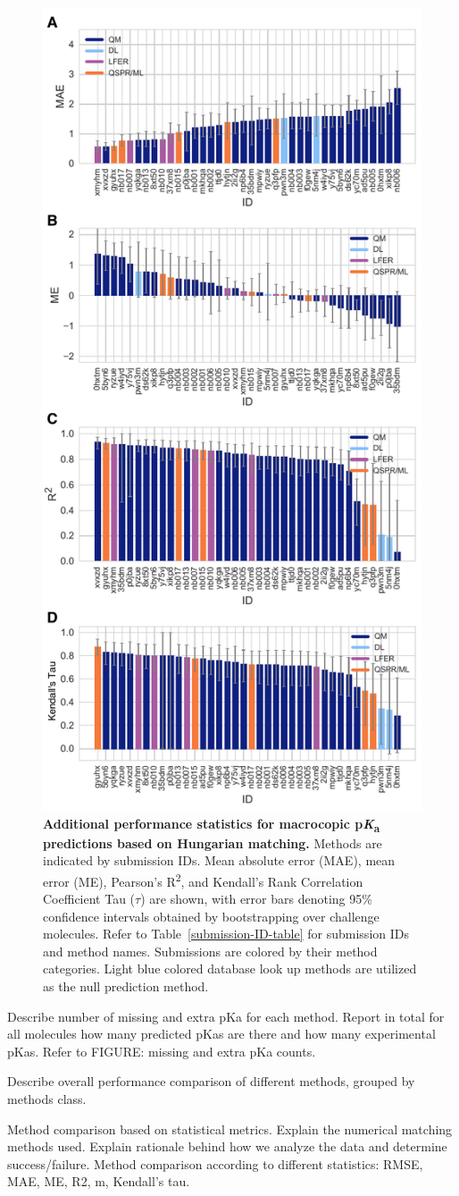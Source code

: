 \documentclass[9pt,lineno,final]{elife}
\newcommand{\pKa}{p\textit{K}\textsubscript{a}}
\begin{document}
\begin{figure}
\centering
\includegraphics[width=0.5\linewidth]{figures/typeIII_statistics.pdf}
\caption{{\bf Additional performance statistics for macrocopic \pKa{} predictions based on Hungarian matching.} 
Methods are indicated by submission IDs. 
Mean absolute error (MAE), mean error (ME), Pearson’s R\textsuperscript{2}, and Kendall’s Rank Correlation Coefficient Tau ($\tau$) are shown, with error bars denoting 95\% confidence intervals obtained by bootstrapping over challenge molecules. Refer to Table~\ref{submission-ID-table} for submission IDs and method names. Submissions are colored by their method categories. Light blue colored database look up methods are utilized as the null prediction method.
}
\label{fig:typeIII-statistics}
\end{figure}


Describe number of missing and extra pKa for each method.  
Report in total for all molecules how many predicted pKas are there and how many experimental pKas.  
Refer to FIGURE: missing and extra pKa counts.  

Describe overall performance comparison of different methods, grouped by methods class.

Method comparison based on statistical metrics.  
Explain the numerical matching methods used. Explain rationale behind how we analyze the data and determine success/failure.  
Method comparison according to different statistics: RMSE, MAE, ME, R2, m, Kendall's tau.  
\end{document}

